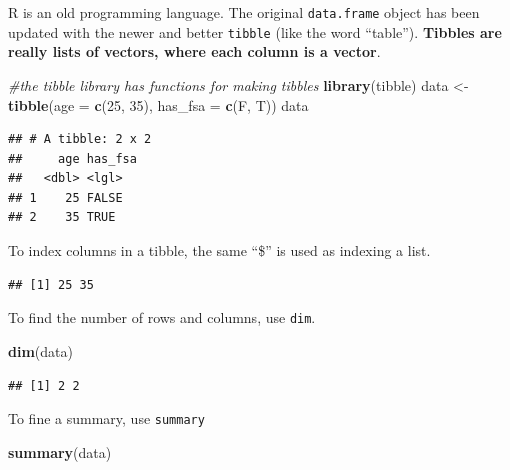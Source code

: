 \documentclass[openany]{book}
\newenvironment{Shaded}{\begin{snugshade}}{\end{snugshade}}
\newcommand{\CommentTok}[1]{\textcolor[rgb]{0.56,0.35,0.01}{\textit{#1}}}
\newcommand{\DataTypeTok}[1]{\textcolor[rgb]{0.13,0.29,0.53}{#1}}
\newcommand{\DecValTok}[1]{\textcolor[rgb]{0.00,0.00,0.81}{#1}}
\newcommand{\KeywordTok}[1]{\textcolor[rgb]{0.13,0.29,0.53}{\textbf{#1}}}
\newcommand{\NormalTok}[1]{#1}
\newcommand{\OperatorTok}[1]{\textcolor[rgb]{0.81,0.36,0.00}{\textbf{#1}}}
\newcommand{\StringTok}[1]{\textcolor[rgb]{0.31,0.60,0.02}{#1}}
\begin{document}
R is an old programming language. The original \texttt{data.frame} object has been updated with the newer and better \texttt{tibble} (like the word ``table''). \textbf{Tibbles are really lists of vectors, where each column is a vector}.

\begin{Shaded}
\begin{Highlighting}[]
\CommentTok{#the tibble library has functions for making tibbles}
\KeywordTok{library}\NormalTok{(tibble) }
\NormalTok{data <-}\StringTok{ }\KeywordTok{tibble}\NormalTok{(}\DataTypeTok{age =} \KeywordTok{c}\NormalTok{(}\DecValTok{25}\NormalTok{, }\DecValTok{35}\NormalTok{), }\DataTypeTok{has_fsa =} \KeywordTok{c}\NormalTok{(F, T))}
\NormalTok{data}
\end{Highlighting}
\end{Shaded}

\begin{verbatim}
## # A tibble: 2 x 2
##     age has_fsa
##   <dbl> <lgl>  
## 1    25 FALSE  
## 2    35 TRUE
\end{verbatim}

To index columns in a tibble, the same ``\$'' is used as indexing a list.

\begin{Shaded}
\end{Shaded}

\begin{verbatim}
## [1] 25 35
\end{verbatim}

To find the number of rows and columns, use \texttt{dim}.

\begin{Shaded}
\begin{Highlighting}[]
\KeywordTok{dim}\NormalTok{(data)}
\end{Highlighting}
\end{Shaded}

\begin{verbatim}
## [1] 2 2
\end{verbatim}

To fine a summary, use \texttt{summary}

\begin{Shaded}
\begin{Highlighting}[]
\KeywordTok{summary}\NormalTok{(data)}
\end{Highlighting}
\end{Shaded}
\end{document}
